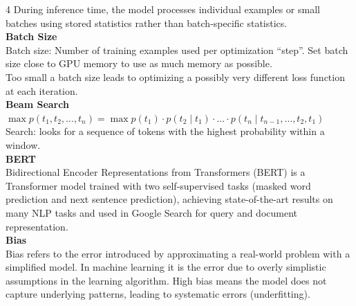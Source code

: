 \documentclass[8pt]{extarticle}
\begin{document}
\begin{multicols}{4}
During inference time, the model processes individual examples or small batches using stored statistics rather than batch-specific statistics.\\
\vspace{2pt}\textbf{Batch Size}\\
Batch size: Number of training examples used per optimization ``step''. Set batch size close to GPU memory to use as much memory as possible.\\
Too small a batch size leads to optimizing a possibly very different loss function at each iteration.\\
\vspace{2pt}\textbf{Beam Search}\\
$ \max p(t_1, t_2, \dots, t_n) = \max p(t_1) \cdot p(t_2 \mid t_1) \cdot \dots \cdot p(t_n \mid t_{n-1}, \dots, t_2, t_1) $\Beam Search: looks for a sequence of tokens with the highest probability within a window.\\
\vspace{2pt}\textbf{BERT}\\
Bidirectional Encoder Representations from Transformers (BERT) is a Transformer model trained with two self-supervised tasks (masked word prediction and next sentence prediction), achieving state-of-the-art results on many NLP tasks and used in Google Search for query and document representation.\\
\vspace{2pt}\textbf{Bias}\\
Bias refers to the error introduced by approximating a real-world problem with a simplified model. In machine learning it is the error due to overly simplistic assumptions in the learning algorithm. High bias means the model does not capture underlying patterns, leading to systematic errors (underfitting).\\


\end{multicols}
\end{document}

